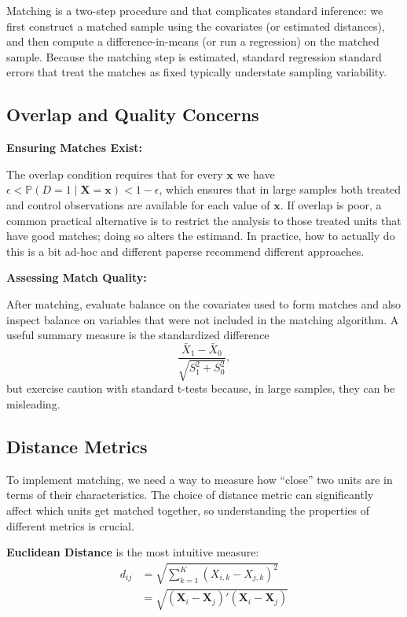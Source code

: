 \documentclass[12pt]{article}
\begin{document}
\begin{multicols}{2}
Matching is a two-step procedure and that complicates standard inference: we first construct a matched sample using the covariates (or estimated distances), and then compute a difference-in-means (or run a regression) on the matched sample. 
Because the matching step is estimated, standard regression standard errors that treat the matches as fixed typically understate sampling variability.

\subsection*{Overlap and Quality Concerns}

\textbf{Ensuring Matches Exist:}

The overlap condition requires that for every $\bm{x}$ we have $\epsilon < \mathbb{P}(D=1 \mid \bm{X}=\bm{x}) < 1-\epsilon$, which ensures that in large samples both treated and control observations are available for each value of $\bm{x}$. 
If overlap is poor, a common practical alternative is to restrict the analysis to those treated units that have good matches; doing so alters the estimand.
In practice, how to actually do this is a bit ad-hoc and different paperse recommend different approaches.

\textbf{Assessing Match Quality:}

After matching, evaluate balance on the covariates used to form matches and also inspect balance on variables that were not included in the matching algorithm. A useful summary measure is the standardized difference
\[
\frac{\bar{X}_1 - \bar{X}_0}{\sqrt{S_1^2 + S_0^2}},
\]
but exercise caution with standard t-tests because, in large samples, they can be misleading.

\subsection*{Distance Metrics}

To implement matching, we need a way to measure how ``close'' two units are in terms of their characteristics.
The choice of distance metric can significantly affect which units get matched together, so understanding the properties of different metrics is crucial.

\textbf{Euclidean Distance} is the most intuitive measure:
\begin{align*}
  d_{ij} 
  &= \sqrt{\sum_{k=1}^K (X_{i,k} - X_{j,k})^2} \\
  &= \sqrt{(\bm{X}_i - \bm{X}_j)'(\bm{X}_i - \bm{X}_j)}
\end{align*}


\end{multicols}
\end{document}
